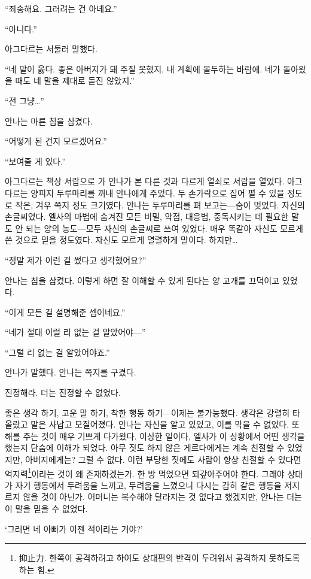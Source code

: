 ``죄송해요. 그러려는 건 아녜요.''

``아니다.''

아그다르는 서둘러 말했다.

``네 말이 옳다. 좋은 아버지가 돼 주질 못했지. 내 계획에 몰두하는 바람에. 네가 돌아왔을 때도 네 말을 제대로 듣진 않았지.''

``전 그냥\ldots''

안나는 마른 침을 삼켰다.

``어떻게 된 건지 모르겠어요.''

``보여줄 게 있다.''

아그다르는 책상 서랍으로 가 안나가 본 다른 것과 다르게 열쇠로 서랍을 열었다. 아그다르는 양피지 두루마리를 꺼내 안나에게 주었다. 두 손가락으로 집어 펼 수 있을 정도로 작은, 겨우 쪽지 정도 크기였다. 안나는 두루마리를 펴 보고는—숨이 멎었다. 자신의 손글씨였다. 엘사의 마법에 숨겨진 모든 비밀, 약점, 대응법, 중독시키는 데 필요한 말도 안 되는 양의 농도—모두 자신의 손글씨로 쓰여 있었다. 매우 똑같아 자신도 모르게 쓴 것으로 믿을 정도였다. 자신도 모르게 열렬하게 말이다. 하지만\ldots

``정말 제가 이런 걸 썼다고 생각했어요?''

안나는 침을 삼켰다. 이렇게 하면 잘 이해할 수 있게 된다는 양 고개를 끄덕이고 있었다.

``이게 모든 걸 설명해준 셈이네요.''

``네가 절대 이럴 리 없는 걸 알았어야—''

``그럴 리 없는 걸 알았어야죠.''

안나가 말했다. 안나는 쪽지를 구겼다.

진정해라. 더는 진정할 수 없었다.

좋은 생각 하기, 고운 말 하기, 착한 행동 하기—이제는 불가능했다. 생각은 강렬히 타올랐고 말은 사납고 모질어졌다. 안나는 자신을 알고 있었고, 이를 막을 수 없었다. 또 해를 주는 것이 매우 기쁘게 다가왔다. 이상한 일이다, 엘사가 이 상황에서 어떤 생각을 했는지 단숨에 이해가 되었다. 아무 짓도 하지 않은 게르다에게는 계속 친절할 수 있었지만, 아버지에게는? 그럴 수 없다. 이런 부당한 짓에도 사람이 항상 친절할 수 있다면 억지력\footnote{抑止力. 한쪽이 공격하려고 하여도 상대편의 반격이 두려워서 공격하지 못하도록 하는 힘.}이라는 것이 왜 존재하겠는가. 한 방 먹었으면 되갚아주어야 한다. 그래야 상대가 자기 행동에서 두려움을 느끼고, 두려움을 느꼈으니 다시는 감히 같은 행동을 저지르지 않을 것이 아닌가. 어머니는 복수해야 달라지는 것 없다고 했겠지만, 안나는 더는 이 말을 믿을 수 없었다.

`그러면 네 아빠가 이젠 적이라는 거야?'

